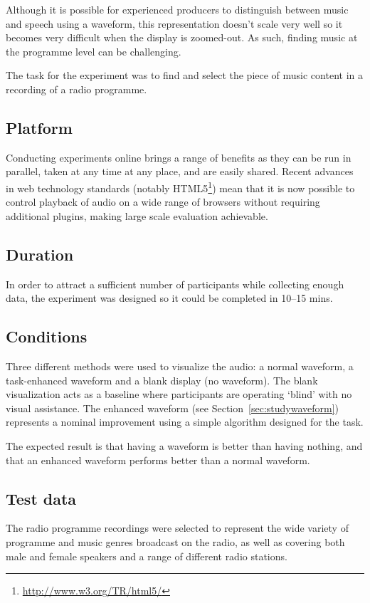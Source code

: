 Although it is possible for experienced producers to distinguish between music
and speech using a waveform, this representation doesn't scale very well so it
becomes very difficult when the display is zoomed-out. As such, finding music
at the programme level can be challenging.

The task for the experiment was to find and select the piece of music content
in a recording of a radio programme.

\subsection{Platform}
Conducting experiments online brings a range of benefits as they can be run in
parallel, taken at any time at any place, and are easily shared. Recent
advances in web technology standards (notably
HTML5\footnote{\url{http://www.w3.org/TR/html5/}}) mean that it is now
possible to control playback of audio on a wide range of browsers without requiring
additional plugins, making large scale evaluation achievable.

\subsection{Duration}
In order to attract a sufficient number of participants while collecting enough
data, the experiment was designed so it could be completed in 10--15 mins.

\subsection{Conditions}
Three different methods were used to visualize the audio: a normal waveform, a
task-enhanced waveform and a blank display (no waveform). The blank
visualization acts as a baseline where participants are operating `blind' with
no visual assistance. The enhanced waveform (see
Section~\ref{sec:studywaveform}) represents a nominal improvement using a
simple algorithm designed for the task.

The expected result is that having a waveform is better than having nothing,
and that an enhanced waveform performs better than a normal waveform.

\subsection{Test data}
The radio programme recordings were selected to represent the wide variety of
programme and music genres broadcast on the radio, as well as covering both
male and female speakers and a range of different radio stations.

